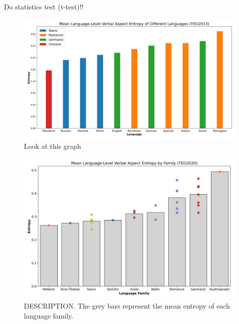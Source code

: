 Do statistics test (t-test)!!

\begin{landscape}
    \begin{figure}
        \centering
        \includegraphics[width=\linewidth]{img/lang_level.jpeg}
        \caption{Look at this graph}
        \label{fig:lang_level}
    \end{figure}

    \begin{figure}
        \centering
        \includegraphics[width=\linewidth]{img/lang_level_2020.jpeg}
        \caption{DESCRIPTION. The grey bars represent the mean entropy of each language family.}
        \label{fig:lang_level_2020}
    \end{figure}
\end{landscape}